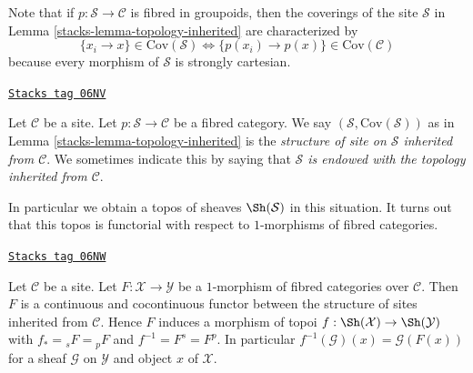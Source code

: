 Note that if $p : \mathcal{S} \to \mathcal{C}$ is fibred in groupoids, then
the coverings of the site $\mathcal{S}$ in
Lemma \ref{stacks-lemma-topology-inherited}
are characterized by
$$
\{x_i \to x\} \in \text{Cov}(\mathcal{S})
\Leftrightarrow
\{p(x_i) \to p(x)\} \in \text{Cov}(\mathcal{C})
$$
because every morphism of $\mathcal{S}$ is strongly cartesian.

\begin{definition}
\label{stacks-definition-topology-inherited}
\href{https://stacks.math.columbia.edu/tag/06NV}{\texttt{Stacks tag 06NV}}

Let $\mathcal{C}$ be a site. Let $p : \mathcal{S} \to \mathcal{C}$ be a
fibred category. We say $(\mathcal{S}, \text{Cov}(\mathcal{S}))$ as in
Lemma \ref{stacks-lemma-topology-inherited}
is the {\it structure of site on $\mathcal{S}$ inherited from $\mathcal{C}$}.
We sometimes indicate this by saying that
{\it $\mathcal{S}$ is endowed with the topology inherited from $\mathcal{C}$}.
\end{definition}

In particular we obtain a topos of sheaves $\Sh(\mathcal{S})$
in this situation. It turns out that this topos is functorial with respect
to $1$-morphisms of fibred categories.

\begin{lemma}
\label{stacks-lemma-topology-inherited-functorial}
\href{https://stacks.math.columbia.edu/tag/06NW}{\texttt{Stacks tag 06NW}}

Let $\mathcal{C}$ be a site. Let $F : \mathcal{X} \to \mathcal{Y}$
be a $1$-morphism of fibred categories over $\mathcal{C}$.
Then $F$ is a continuous and cocontinuous functor between the structure
of sites inherited from $\mathcal{C}$. Hence $F$ induces a morphism of topoi
$f : \Sh(\mathcal{X}) \to \Sh(\mathcal{Y})$ with
$f_* = {}_sF = {}_pF$ and $f^{-1} = F^s = F^p$. In particular
$f^{-1}(\mathcal{G})(x) = \mathcal{G}(F(x))$
for a sheaf $\mathcal{G}$ on $\mathcal{Y}$ and object $x$ of $\mathcal{X}$.
\end{lemma}

